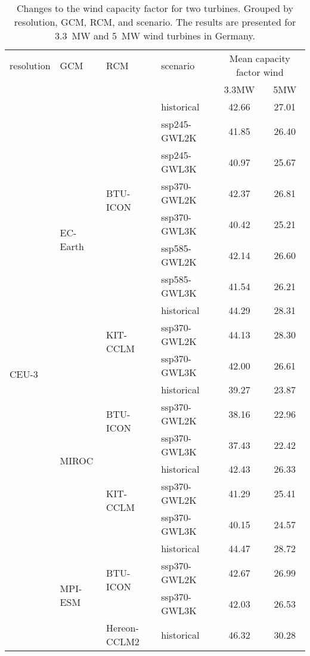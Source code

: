 \begin{table}[!htbp]
\centering
\caption{Changes to the wind capacity factor for two turbines. Grouped by resolution, GCM, RCM, and scenario. The results are presented for \qty{3.3}{\mega\watt} and \qty{5}{\mega\watt} wind turbines in Germany.}
\label{Table:CF_Wind_changes}
\begin{tabular}{lll|l|cc}
\toprule
resolution & GCM & RCM & scenario & \multicolumn{2}{c}{Mean capacity factor wind} \\
 & & & & 3.3\si{\mega\watt} & 5\si{\mega\watt}  \\
\midrule
\multirow{22}{*}{CEU-3} & \multirow{10}{*}{EC-Earth} & \multirow{7}{*}{BTU-ICON} & historical & 42.66 & 27.01 \\
 &  &  & ssp245-GWL2K & 41.85 & 26.40 \\
 &  &  & ssp245-GWL3K & 40.97 & 25.67 \\
 &  &  & ssp370-GWL2K & 42.37 & 26.81 \\
 &  &  & ssp370-GWL3K & 40.42 & 25.21 \\
 &  &  & ssp585-GWL2K & 42.14 & 26.60 \\
 &  &  & ssp585-GWL3K & 41.54 & 26.21 \\
\cmidrule(lr){3-6}
 &  & \multirow{3}{*}{KIT-CCLM} & historical & 44.29 & 28.31 \\
 &  &  & ssp370-GWL2K & 44.13 & 28.30 \\
 &  &  & ssp370-GWL3K & 42.00 & 26.61 \\
\cmidrule(lr){3-6}
\cmidrule(lr){2-6}
 & \multirow{6}{*}{MIROC} & \multirow{3}{*}{BTU-ICON} & historical & 39.27 & 23.87 \\
 &  &  & ssp370-GWL2K & 38.16 & 22.96 \\
 &  &  & ssp370-GWL3K & 37.43 & 22.42 \\
\cmidrule(lr){3-6}
 &  & \multirow{3}{*}{KIT-CCLM} & historical & 42.43 & 26.33 \\
 &  &  & ssp370-GWL2K & 41.29 & 25.41 \\
 &  &  & ssp370-GWL3K & 40.15 & 24.57 \\
\cmidrule(lr){3-6}
\cmidrule(lr){2-6}
 & \multirow{6}{*}{MPI-ESM} & \multirow{3}{*}{BTU-ICON} & historical & 44.47 & 28.72 \\
 &  &  & ssp370-GWL2K & 42.67 & 26.99 \\
 &  &  & ssp370-GWL3K & 42.03 & 26.53 \\
\cmidrule(lr){3-6}
 &  & \multirow{3}{*}{Hereon-CCLM2} & historical & 46.32 & 30.28 \\

\end{tabular}
\end{table}
